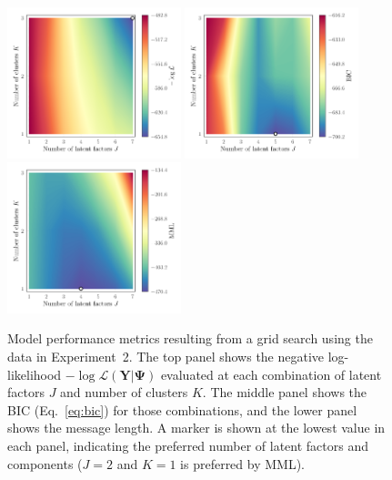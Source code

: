 \documentclass[twocolumn]{aastex62}
\newcommand{\vect}[1]{\boldsymbol{\mathbf{#1}}}
\renewcommand{\vec}[1]{\vect{#1}}
\newcommand{\data}{\textbf{Y}}
\newcommand{\scorecovs}{\vec\Omega}
\newcommand{\NumLatentFactors}{J}
\newcommand{\NumComponents}{K}
\begin{document}
\begin{figure}
	\includegraphics[width=0.45\textwidth]{experiments/exp2-log-xfe-offset-gridsearch-ll.pdf}
	\includegraphics[width=0.45\textwidth]{experiments/exp2-log-xfe-offset-gridsearch-bic.pdf}
	\includegraphics[width=0.45\textwidth]{experiments/exp2-log-xfe-offset-gridsearch-mml.pdf}
    \caption{Model performance metrics resulting from a grid search using the
    		 \citet{Barklem:2005} data in Experiment~2.
    		 The top panel shows the negative log-likelihood 
			 $-\log{\mathcal{L}\left(\data|\vec\Psi\right)}$ 
			 evaluated at each combination of latent factors $\NumLatentFactors$ and number 
			 of clusters $\NumComponents$. The middle panel shows the BIC (Eq.~\ref{eq:bic})
			 for those combinations, and the lower panel shows the message length. 
			 A marker is shown at the lowest value in each panel, indicating
			 the preferred number of latent factors and components 
			 ($\NumLatentFactors = 2$ and $\NumComponents = 1$ is preferred by MML).}
    \label{fig:exp2-gridsearch-contours}
\end{figure}
\end{document}
